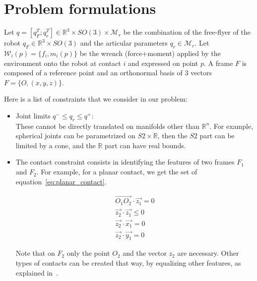 \section{Problem formulations}
\label{sec:problem_formulations}

Let $q=[q_F^T; q_r^T]\in\mathbb{R}^3\times SO(3)\times \mathcal{M}_r$ be the combination of the free-flyer of the robot $q_F\in \mathbb{R}^3 \times SO(3)$ and the articular parameters $q_r\in\mathcal{M}_r$.
Let $\mathcal{W}_i(p)=\{f_i,m_i(p)\}$ be the wrench (force+moment) applied by the environment onto the robot at contact $i$ and expressed on point $p$.
A frame $F$ is composed of a reference point and an orthonormal basis of 3 vectors $F = \{O, (x, y, z)\}$.

Here is a list of constraints that we consider in our problem:
\begin{itemize}
\item Joint limits ${q^-} \leq q_r \leq {q^+}$:\\
These cannot be directly translated on manifolds other than $\mathbb{R}^n$.
For example, spherical joints can be parametrized on $S2 \times \mathbb{R}$, then the $S2$ part can be limited by a cone, and the $\mathbb{R}$ part can have real bounds.
\item The contact constraint consists in identifying the features of two frames $F_1$ and $F_2$.
For example, for a planar contact, we get the set of equation~\ref{eq:planar_contact}.

\begin{equation}
  \begin{split}
    \overrightarrow{O_1O_2}\cdot\vec{z_1} = 0\\
    \vec{z_2}\cdot\vec{z_1} \leq 0 \\
    \vec{z_2}\cdot\vec{x_1} = 0 \\
    \vec{z_2}\cdot\vec{y_1} = 0
  \end{split}
  \label{eq:planar_contact}
\end{equation}

Note that on $F_2$ only the point $O_2$ and the vector $z_2$ are necessary.
Other types of contacts can be created that way, by equalizing other features, as explained in~\cite{escande:ras:2013}.


\end{itemize}
